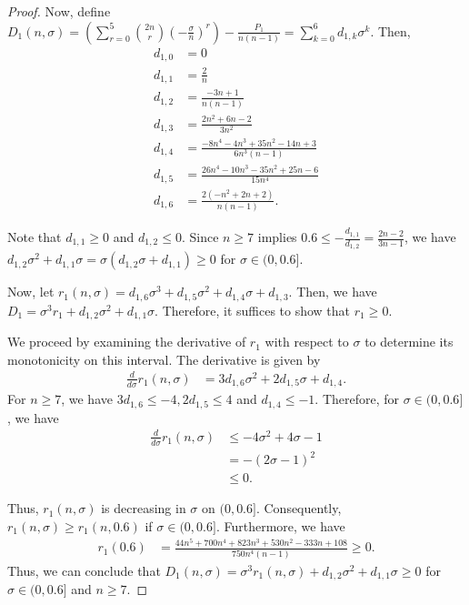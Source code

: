 \documentclass{article}
\theoremstyle{plain}
\theoremstyle{definition}
\theoremstyle{remark}
\def\bigopen#1{\left(#1\right)}
\begin{document}
\begin{proof}
Now, define $D_1(n, \sigma) = \bigopen{\sum_{r=0}^5 \binom{2n}{r} \bigopen{ -\frac{\sigma}{n} }^r} - \frac{P_1}{n(n-1)} = \sum_{k=0}^6 d_{1,k}\sigma^k$. Then, 
\begin{align*}
    d_{1,0} &= 0 \\
    d_{1,1} &= \frac{2}{n} \\
    d_{1,2} &= \frac{-3n + 1}{n(n - 1)} \\
    d_{1,3} &= \frac{2n^2 + 6n - 2}{3n^2} \\
    d_{1,4} &= \frac{-8n^4 - 4n^3 + 35n^2 - 14n + 3}{6n^3(n - 1)} \\
    d_{1,5} &= \frac{26n^4 - 10n^3 - 35n^2 + 25n - 6}{15n^4} \\
    d_{1,6} &= \frac{2(-n^2 + 2n + 2)}{n(n - 1)}.
\end{align*}

Note that $d_{1,1} \ge 0$ and $d_{1,2} \le 0$. Since $n \ge 7$ implies $0.6 \le -\frac{d_{1,1}}{d_{1,2}} = \frac{2n-2}{3n-1}$, we have $d_{1,2}\sigma^2 + d_{1,1}\sigma = \sigma(d_{1,2}\sigma + d_{1,1}) \ge 0$ for $\sigma \in (0, 0.6]$. 

Now, let $r_1(n, \sigma) = d_{1,6}\sigma^3 + d_{1,5}\sigma^2 + d_{1,4}\sigma + d_{1,3}$. Then, we have $D_1 = \sigma^3 r_1 + d_{1,2}\sigma^2 + d_{1,1}\sigma$. Therefore, it suffices to show that $r_1 \ge 0$.

We proceed by examining the derivative of $r_1$ with respect to $\sigma$ to determine its monotonicity on this interval. The derivative is given by 
\begin{align*}
    \frac{d}{d\sigma} r_1(n, \sigma) &= 3d_{1,6}\sigma^2 + 2d_{1,5}\sigma + d_{1,4}.
\end{align*}
For $n\ge 7$, we have $3d_{1,6}\le -4, 2d_{1,5}\le 4$ and $d_{1,4}\le -1$. Therefore, for $\sigma\in (0, 0.6]$, we have 
\begin{align*}
    \frac{d}{d\sigma} r_1(n, \sigma) &\le -4\sigma^2+4\sigma-1 \\
    &= -(2\sigma-1)^2 \\
    &\le 0.
\end{align*}

Thus, $r_1(n, \sigma)$ is decreasing in $\sigma$ on $(0, 0.6]$. Consequently, $r_1(n, \sigma)\ge r_1(n, 0.6)$ if $\sigma\in (0, 0.6]$. Furthermore, we have 
\begin{align*}
    r_1(0.6) &= \frac{44n^5 + 700n^4 + 823n^3 + 530n^2 - 333n + 108}{750 n^4 \bigopen{n - 1}} \ge 0.
\end{align*}
Thus, we can conclude that $D_1(n, \sigma)=\sigma^3 r_1(n, \sigma) + d_{1,2}\sigma^2+d_{1,1}\sigma \ge 0$ for $\sigma \in (0, 0.6]$ and $n\ge 7$.


\end{proof}
\end{document}
